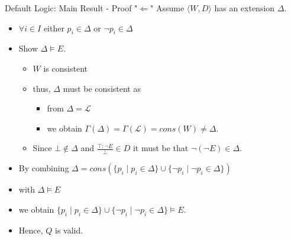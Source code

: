 \documentclass[usenames,dvipsnames, 8pt]{beamer}
\let\lneg\neg
\begin{document}
\begin{frame}{Default Logic: Main Result - Proof "$\Longleftarrow$"}
Assume $\langle W, D\rangle$ has an extension $\Delta$.
\begin{itemize}[label = {$\bullet$}]
\item $\forall i \in I$ either $p_i \in \Delta$ or $\lneg p_i \in \Delta$
\item Show $\Delta \models E$.
\begin{itemize}[label={$-$}]
\item $W$ is consistent
\item thus, $\Delta$ must be consistent as
\begin{itemize}[label={$>$}]
\item from $\Delta = \mathcal{L}$
\item we obtain $\Gamma(\Delta)= \Gamma(\mathcal{L})=cons(W)  \neq \Delta$.
\end{itemize}
\item Since $\bot \nin \Delta$ and $\frac{\top:\lneg E}{\bot}\in D$ it must be that $\lneg (\lneg E) \in \Delta$.
\end{itemize}
\item By combining $\Delta = cons(\{p_i \mid p_i \in \Delta\} \cup \{\lneg p_i \mid \lneg p_i \in \Delta\})$ 
\item with $\Delta \models E$
\item we obtain $\{p_i \mid p_i \in \Delta\} \cup \{\lneg p_i \mid \lneg p_i \in \Delta\} \models E$.
\item Hence, $Q$ is valid.
\end{itemize}
\end{frame}
\end{document}
